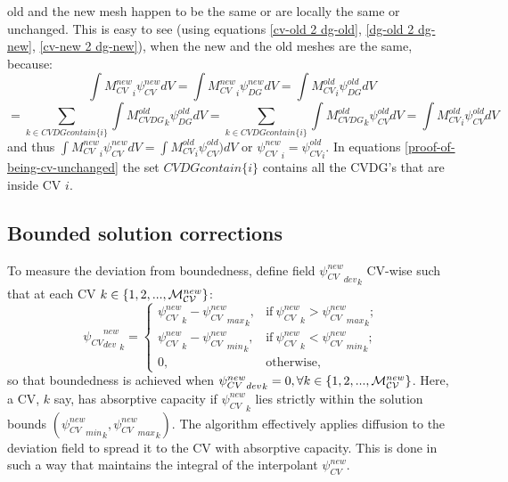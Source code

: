 old and the new mesh happen to be the same or are locally the same or unchanged. 
This is easy to see (using equations \ref{cv-old 2 dg-old}, \ref{dg-old 2 dg-new}, \ref{cv-new 2 dg-new}),    
when the new and the old meshes are the same, because:
\begin{equation}
\int {M_{CV}^{new}}_i \psi_{CV}^{new} dV = 
\int {M_{CV}^{new}}_i \psi_{DG}^{new} dV =
\int  {M_{CV}^{old}}_i \psi_{DG}^{old} dV 
\end{equation}
\begin{equation}
=
\sum_{k\in CVDGcontain\{i\} } \int  {M_{CVDG}^{old}}_k \psi_{DG}^{old} dV =
\sum_{k\in CVDGcontain\{i\} } \int  {M_{CVDG}^{old}}_k \psi_{CV}^{old} dV =
\int  {M_{CV}^{old}}_i \psi_{CV}^{old}  dV
\label{proof-of-being-cv-unchanged}
\end{equation}
and thus $\int {M_{CV}^{new}}_i \psi_{CV}^{new} dV =\int  {M_{CV}^{old}}_i \psi_{CV}^{old} ) dV$ 
or ${\psi_{CV}^{new}}_i={\psi_{CV}^{old}}_i$. 
In equations \ref{proof-of-being-cv-unchanged} the set $CVDGcontain\{i\}$ contains all the 
CVDG's that are inside CV $i$. 



\subsection{Bounded solution corrections}
\label{Bounded solution corrections}
To measure the deviation from boundedness, define 
field ${{\psi_{CV}^{new}}_{dev}}_k$ CV-wise such that at each CV $k\in\{1,2,...,{\cal M}^{new}_{\cal CV}\}$: 
\begin{equation}
{{\psi_{CV}}^{new}_{dev}}_k=
  \begin{cases}
    {\psi_{CV}^{new}}_k - {{\psi_{CV}^{new}}_{max}}_k, & \text{if} \
    {\psi_{CV}^{new}}_k> {{\psi_{CV}^{new}}_{max}}_k; \\
    {\psi_{CV}^{new}}_k -{{\psi_{CV}^{new}}_{min}}_k, & \text{if} \
    {\psi_{CV}^{new}}_k< {{\psi_{CV}^{new}}_{min}}_k; \\
    0,  & \text{otherwise},
  \end{cases}
\label{q_dev}
\end{equation}
so that boundedness is achieved when ${{\psi_{CV}^{new}}_{dev}}_k=0, \forall k\in\{1,2,...,{\cal M}^{new}_{\cal CV}\}$. Here, 
a CV, $k$ say, has absorptive capacity if ${{\psi_{CV}^{new}}}_k$
lies strictly within the solution bounds $({{\psi_{CV}^{new}}_{min}}_k,{{\psi_{CV}^{new}}_{max}}_k)$. 
The algorithm effectively applies diffusion to the deviation field to 
spread it to the CV with absorptive capacity. This is done in such a 
way that maintains the integral of the interpolant ${\psi_{CV}^{new}}$. 

